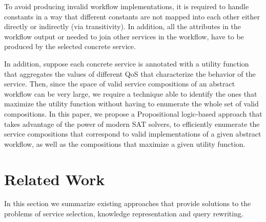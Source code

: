 \documentclass{llncs}
\begin{document}
To avoid producing invalid workflow implementations, it is required to handle constants in a way that different constants are not mapped into
each other either directly or indirectly (via transitivity). In addition,  all the attributes in the workflow output  or needed to join other services in the workflow, have to be produced by the selected concrete service.

In addition, suppose each concrete service is annotated with a utility function that aggregates the values of different QoS that characterize the behavior of the service. Then, since the space of valid service compositions of an abstract workflow can be very large, we require a technique able to identify the ones that maximize the utility function  without having to enumerate the whole set of valid compositions. In this paper, we propose a Propositional logic-based  approach that takes advantage of the  power of  modern SAT solvers, to efficiently enumerate the service compositions that correspond to valid implementations of a given abstract workflow, as well as the compositions that maximize a given utility function. 

\section{Related Work}
In this section we summarize existing approaches that provide solutions to the problems of service selection, knowledge representation and query rewriting. 
\end{document}
